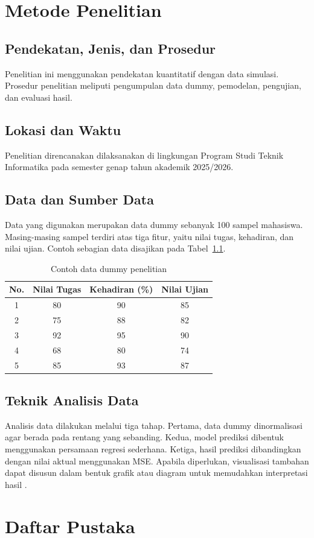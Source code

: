 \documentclass[proposal]{unnes-ta_plus}
\begin{document}
\chapter{Metode Penelitian}
\section{Pendekatan, Jenis, dan Prosedur}
Penelitian ini menggunakan pendekatan kuantitatif dengan data simulasi. Prosedur penelitian meliputi pengumpulan data dummy, pemodelan, pengujian, dan evaluasi hasil.

\section{Lokasi dan Waktu}
Penelitian direncanakan dilaksanakan di lingkungan Program Studi Teknik Informatika pada semester genap tahun akademik 2025/2026.

\section{Data dan Sumber Data}
Data yang digunakan merupakan data dummy sebanyak 100 sampel mahasiswa. Masing-masing sampel terdiri atas tiga fitur, yaitu nilai tugas, kehadiran, dan nilai ujian. Contoh sebagian data disajikan pada Tabel~\ref{tab:data-dummy}.

\begin{table}[H]
    \centering
    \caption{Contoh data dummy penelitian}
    \label{tab:data-dummy}
    \begin{tabular}{cccc}
        \toprule
        No. & Nilai Tugas & Kehadiran (\%) & Nilai Ujian \\
        \midrule
        1 & 80 & 90 & 85 \\
        2 & 75 & 88 & 82 \\
        3 & 92 & 95 & 90 \\
        4 & 68 & 80 & 74 \\
        5 & 85 & 93 & 87 \\
        \bottomrule
    \end{tabular}
\end{table}

\section{Teknik Analisis Data}
Analisis data dilakukan melalui tiga tahap. Pertama, data dummy dinormalisasi agar berada pada rentang yang sebanding. Kedua, model prediksi dibentuk menggunakan persamaan regresi sederhana. Ketiga, hasil prediksi dibandingkan dengan nilai aktual menggunakan MSE. Apabila diperlukan, visualisasi tambahan dapat disusun dalam bentuk grafik atau diagram untuk memudahkan interpretasi hasil \cite{santoso2021}.

\chapter*{Daftar Pustaka}
\printbibliography[heading=none]
\end{document}
